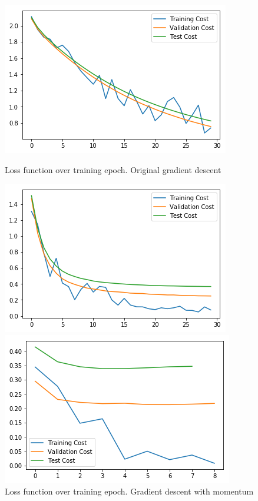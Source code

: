 \documentclass{article}
\begin{document}
\begin{figure}[h]
	\begin{minipage}{0.3\textwidth}
	\centering
	\includegraphics[width=\textwidth]{pics/loss_original.png}
	\caption{Loss function over training epoch. Original gradient descent}
	\end{minipage}\hfill
	\begin{minipage}{0.3\textwidth}
	\centering
	\includegraphics[width=\textwidth]{pics/loss_momentum.png}
	\caption{Loss function over training epoch. Gradient descent with momentum}
	\end{minipage}\hfill
	\begin{minipage}{0.3\textwidth}
	\centering
	\includegraphics[width=\textwidth]{pics/loss_adam.png}

\end{minipage}
\end{figure}
\end{document}
